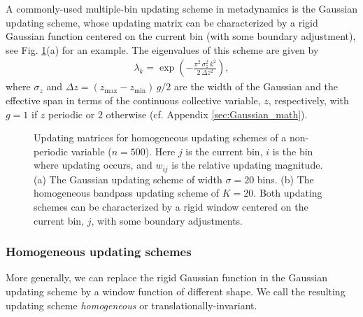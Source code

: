 \documentclass[reprint, superscriptaddress, floatfix]{revtex4-1}
\begin{document}
A commonly-used multiple-bin updating scheme in metadynamics
is the Gaussian updating scheme,
whose updating matrix can be characterized by
a rigid Gaussian function centered on the current bin
(with some boundary adjustment),
see Fig. \ref{fig:mat}(a) for an example.
%
The eigenvalues of this scheme are given by\cite{bussi2006}
\begin{align}
  \lambda_k
  =
  \exp\left(
        -
        \frac{ \pi^2 \, \sigma_z^2 \, k^2 }
             { 2 \, \Delta z^2 }
      \right)
  ,
  \label{eq:lambda_Gaussian}
\end{align}
where $\sigma_z$ and $\Delta z = (z_{\max} - z_{\min}) \, g/2$
are the width of the Gaussian and the effective span
in terms of the continuous collective variable, $z$,
respectively,
with $g = 1$ if $z$ periodic or $2$ otherwise
(cf. Appendix \ref{sec:Gaussian_math}).


\begin{figure}[h]\centering
  \caption{
    \label{fig:mat}
    Updating matrices for
    homogeneous updating schemes of
    a non-periodic variable ($n = 500$).
    Here $j$ is the current bin,
    $i$ is the bin where updating occurs,
    and $w_{ij}$ is the relative updating magnitude.
    (a) The Gaussian updating scheme of width $\sigma = 20$ bins.
    (b) The homogeneous bandpass updating scheme of $K = 20$.
    Both updating schemes
    can be characterized by a rigid window
    centered on the current bin, $j$,
    with some boundary adjustments.
  }
\end{figure}




\subsubsection{\label{sec:homo_scheme}
Homogeneous updating schemes}


More generally, we can replace the rigid Gaussian function
in the Gaussian updating scheme
by a window function of different shape.
%
We call the resulting updating scheme
\emph{homogeneous} or
translationally-invariant.
\end{document}
